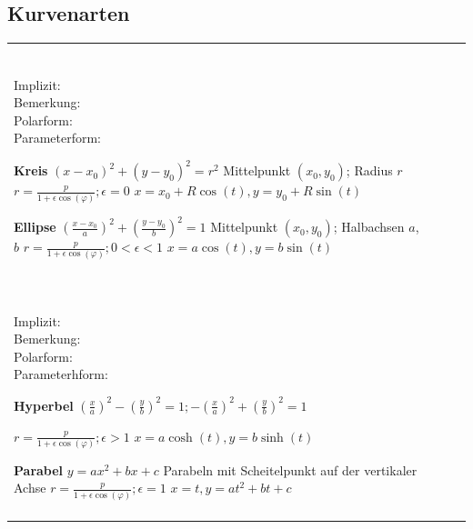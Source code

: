\subsection{Kurvenarten}
\begin{tabular}{llll}
\parbox{2.7cm}{
\textbf{ } \\
Implizit:\\
Bemerkung:\\
Polarform:\\
Parameterform:
}

\parbox{6cm}{
\textbf{Kreis}\\
$(x-x_0)^2 + (y - y_0)^2 = r^2$\\
Mittelpunkt $(x_0, y_0)$; Radius $r$\\
$r = \frac{p}{1 + \epsilon \cos(\varphi)}; \epsilon = 0$ \\
$x=x_0 + R\cos(t), y=y_0 + R\sin(t)$
}

\parbox{8cm}{
\textbf{Ellipse}\\
$(\frac{x-x_0}{a})^2 + (\frac{y-y_0}{b})^2 = 1$\\
Mittelpunkt $(x_0, y_0)$; Halbachsen $a$, $b$\\
$r = \frac{p}{1 + \epsilon \cos(\varphi)}; 0 < \epsilon < 1$\\
$x = a\cos(t), y = b\sin(t)$
}\\ \\

\parbox{2.7cm}{
\textbf {}\\
Implizit:\\
Bemerkung:\\
Polarform:\\
Parameterhform:
}

\parbox{6cm}{
\textbf{Hyperbel}\\ 
$(\frac{x}{a})^2 - (\frac{y}{b})^2 = 1; -(\frac{x}{a})^2 + (\frac{y}{b})^2 =1$\\ 
\\
$r = \frac{p}{1 + \epsilon \cos(\varphi)}; \epsilon > 1$\\
$x= a \cosh(t), y = b \sinh(t) $
}

\parbox{8cm}{
\textbf{Parabel}\\
$y= ax^2 + bx + c$\\
Parabeln mit Scheitelpunkt auf der vertikaler Achse\\
$r = \frac{p}{1 + \epsilon \cos(\varphi)}; \epsilon = 1$\\
$x=t, y = a t^2 + b t + c$
}\\ \\


\end{tabular}
